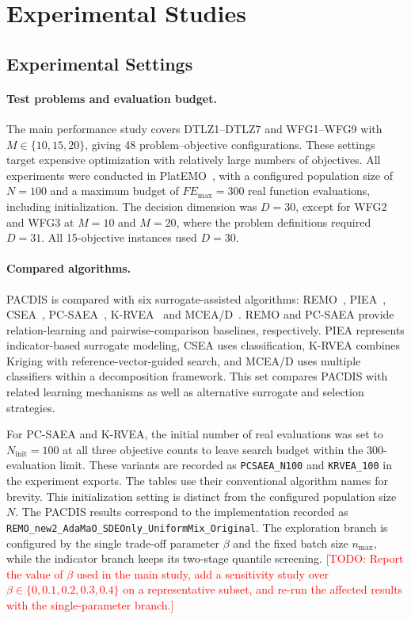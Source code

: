 \documentclass[final,5p,times,twocolumn]{elsarticle}
\newcommand{\TODO}[1]{\textcolor{red}{[TODO: #1]}}
\begin{document}
\section{Experimental Studies}
\label{sec:exp}

\subsection{Experimental Settings}
\label{sec:exp:settings}

\paragraph{Test problems and evaluation budget.}
The main performance study covers DTLZ1--DTLZ7 and WFG1--WFG9 with
$M\in\{10,15,20\}$, giving 48 problem--objective configurations. These
settings target expensive optimization with relatively large numbers of
objectives. All experiments were conducted in PlatEMO~\cite{ref:platemo},
with a configured population size of $N=100$ and a maximum budget of
$FE_{\max}=300$ real function evaluations, including initialization.
The decision dimension was $D=30$, except for WFG2 and WFG3 at
$M=10$ and $M=20$, where the problem definitions required $D=31$.
All 15-objective instances used $D=30$.

\paragraph{Compared algorithms.}
PACDIS is compared with six surrogate-assisted algorithms:
REMO~\cite{ref:remo}, PIEA~\cite{ref:piea}, CSEA~\cite{ref:csea},
PC-SAEA~\cite{ref:pcsaea}, K-RVEA~\cite{ref:krvea} and
MCEA/D~\cite{ref:mcead}. REMO and PC-SAEA provide relation-learning and
pairwise-comparison baselines, respectively. PIEA represents indicator-based
surrogate modeling, CSEA uses classification, K-RVEA combines Kriging with
reference-vector-guided search, and MCEA/D uses multiple classifiers within
a decomposition framework. This set compares PACDIS with related learning
mechanisms as well as alternative surrogate and selection strategies.

For PC-SAEA and K-RVEA, the initial number of real evaluations was set to
$N_{\mathrm{init}}=100$ at all three objective counts to leave search budget
within the 300-evaluation limit. These variants are recorded as
\texttt{PCSAEA\_N100} and \texttt{KRVEA\_100} in the experiment exports.
The tables use their conventional algorithm names for brevity.
This initialization setting is distinct from the configured population size
$N$. The PACDIS results correspond to the implementation recorded as
\texttt{REMO\_new2\_AdaMaO\_SDEOnly\_UniformMix\_Original}.
The exploration branch is configured by the single trade-off parameter $\beta$
and the fixed batch size $n_{\max}$, while the indicator branch keeps its
two-stage quantile screening.
\TODO{Report the value of $\beta$ used in the main study, add a sensitivity
study over $\beta\in\{0,0.1,0.2,0.3,0.4\}$ on a representative subset, and
re-run the affected results with the single-parameter branch.}
\end{document}
